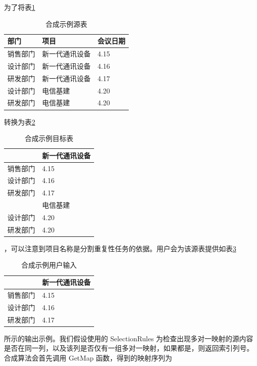 \documentclass[design, pageheader]{njubachelor}
\begin{document}
为了将表\ref{table:example_source}
\begin{table}[!htbp]
    \centering   
    \begin{tabular}{|l|l|l|}
    \hline
    部门 & 项目 & 会议日期  \\ \hline
    销售部门  & 新一代通讯设备 & 4.15      \\ \hline
    设计部门   & 新一代通讯设备 & 4.16   \\ \hline
    研发部门  & 新一代通讯设备 & 4.17 \\ \hline
    设计部门  & 电信基建    & 4.20     \\ \hline
    研发部门   & 电信基建    & 4.20    \\ \hline
    \end{tabular}
    \caption{合成示例源表}
    \label{table:example_source}
\end{table}
转换为表\ref{table:example_target}
\begin{table}[!htbp] 
    \centering   
    \begin{tabular}{|l|l|}
    \hline
     & 新一代通讯设备 \\ \hline
    销售部门   & 4.15      \\ \hline
    设计部门   & 4.16   \\ \hline
    研发部门   & 4.17 \\ \hline
    & 电信基建 \\ \hline
    设计部门   & 4.20     \\ \hline
    研发部门   & 4.20    \\ \hline
    \end{tabular}
    \caption{合成示例目标表}
    \label{table:example_target}
\end{table}，可以注意到项目名称是分割重复性任务的依据。用户会为该源表提供如表\ref{table:example_target_example}
\begin{table}[!htbp] 
    \centering   
    \begin{tabular}{|l|l|}
    \hline
     & 新一代通讯设备 \\ \hline
    销售部门   & 4.15      \\ \hline
    设计部门   & 4.16   \\ \hline
    研发部门   & 4.17 \\ \hline
    \end{tabular}
    \caption{合成示例用户输入}
    \label{table:example_target_example}
\end{table}所示的输出示例。我们假设使用的 SelectionRules 为检查出现多对一映射的源内容是否在同一列，以及该列是否仅有一组多对一映射，如果都是，则返回索引列号。合成算法会首先调用 GetMap 函数，得到的映射序列为
\end{document}
